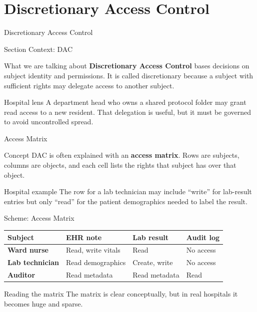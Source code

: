 \documentclass[presentation]{beamer}
\newcommand{\sectiontitleframe}[1]{
\begin{frame}[plain,c]
\begin{center}
{\usebeamerfont{title}\usebeamercolor[fg]{title}#1}
\end{center}
\end{frame}
}
\begin{document}
\section{Discretionary Access Control}
\sectiontitleframe{Discretionary Access Control}

\begin{frame}[c]{Section Context: DAC}
\begin{block}{What we are talking about}
\textbf{Discretionary Access Control} bases decisions on subject identity and permissions. It is
called discretionary because a subject with sufficient rights may delegate access to another subject.
\end{block}

\begin{exampleblock}{Hospital lens}
A department head who owns a shared protocol folder may grant read access to a new resident. That
delegation is useful, but it must be governed to avoid uncontrolled spread.
\end{exampleblock}
\end{frame}

\begin{frame}[c]{Access Matrix}
\begin{block}{Concept}
DAC is often explained with an \textbf{access matrix}. Rows are subjects, columns are objects, and
each cell lists the rights that subject has over that object.
\end{block}

\begin{exampleblock}{Hospital example}
The row for a lab technician may include ``write'' for lab-result entries but only ``read'' for the
patient demographics needed to label the result.
\end{exampleblock}
\end{frame}

\begin{frame}[c]{Scheme: Access Matrix}
\begin{center}
\scriptsize
\renewcommand{\arraystretch}{1.25}
\begin{tabular}{>{\bfseries}p{} p{} p{} p{}}
\toprule
Subject & EHR note & Lab result & Audit log \\
\midrule
Ward nurse & Read, write vitals & Read & No access \\
Lab technician & Read demographics & Create, write & No access \\
Auditor & Read metadata & Read metadata & Read \\
\bottomrule
\end{tabular}
\end{center}

\begin{block}{Reading the matrix}
The matrix is clear conceptually, but in real hospitals it becomes huge and sparse.
\end{block}
\end{frame}
\end{document}
